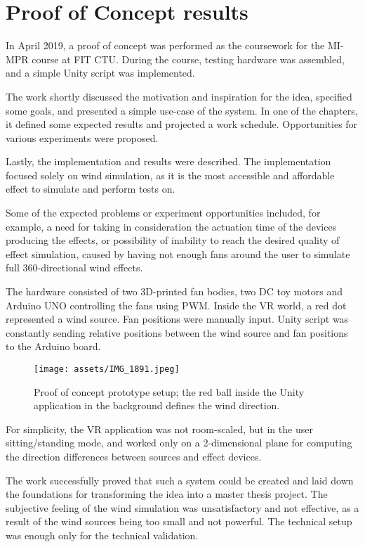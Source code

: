 \chapter{Proof of Concept results}

In April 2019, a proof of concept was performed as the coursework for the MI-MPR
course at FIT CTU. During the course, testing hardware was assembled,
and a simple Unity script was implemented.


The work shortly discussed the motivation and inspiration for the idea,
specified some goals, and presented a simple use-case of the system. In one of the
chapters, it defined some expected results and projected a work schedule.
Opportunities for various experiments were proposed.


Lastly, the implementation and results were described. The implementation
focused solely on wind simulation, as it is the most accessible and affordable
effect to simulate and perform tests on.


Some of the expected problems or experiment opportunities included, for example,
a need for taking in consideration the actuation time of the devices producing
the effects, or possibility of inability to reach the desired quality of effect
simulation, caused by having not enough fans around the user to simulate
full 360-directional wind effects.


The hardware consisted of two 3D-printed fan bodies, two DC toy motors and Arduino
UNO controlling the fans using PWM. Inside
the VR world, a red dot represented a wind source. Fan positions were manually
input. Unity script was constantly sending relative positions between the
wind source and fan positions to the Arduino board.


\begin{figure}[h]{}
\centering\texttt{[image: assets/IMG\_1891.jpeg]}
\caption{
    Proof of concept prototype setup; the red ball inside the Unity application in the background defines the wind direction.
}
\end{figure}

For simplicity, the VR application was not room-scaled, but in the
user sitting/standing mode, and worked only on a 2-dimensional plane for
computing the direction differences between sources and effect devices.


The work successfully proved that such a system could be created and laid down
the foundations for transforming the idea into a master thesis project. The subjective
feeling of the wind simulation was unsatisfactory and not effective, 
as a result of the wind sources being too small and not powerful. 
The technical setup was enough only for the technical validation.

